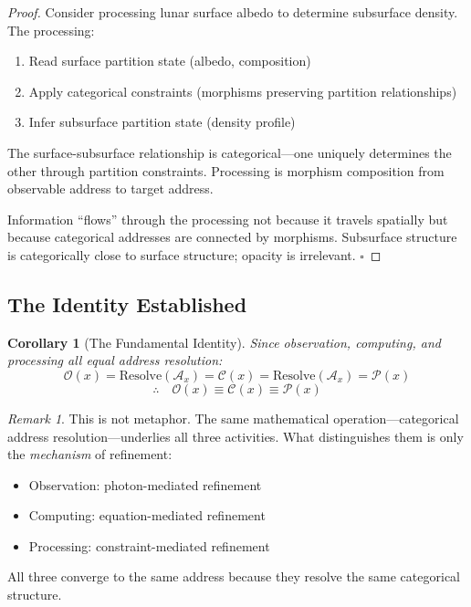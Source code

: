 \documentclass[12pt,a4paper]{article}
\newtheorem{corollary}[theorem]{Corollary}
\theoremstyle{definition}
\theoremstyle{remark}
\newtheorem{remark}[theorem]{Remark}
\newcommand{\Obs}{\mathcal{O}}
\newcommand{\Comp}{\mathcal{C}}
\newcommand{\Proc}{\mathcal{P}}
\begin{document}
\begin{proof}
Consider processing lunar surface albedo to determine subsurface density. The processing:
\begin{enumerate}
    \item Read surface partition state (albedo, composition)
    \item Apply categorical constraints (morphisms preserving partition relationships)
    \item Infer subsurface partition state (density profile)
\end{enumerate}

The surface-subsurface relationship is categorical---one uniquely determines the other through partition constraints. Processing is morphism composition from observable address to target address.

Information ``flows'' through the processing not because it travels spatially but because categorical addresses are connected by morphisms. Subsurface structure is categorically close to surface structure; opacity is irrelevant. $\square$
\end{proof}

\subsection{The Identity Established}

\begin{corollary}[The Fundamental Identity]
Since observation, computing, and processing all equal address resolution:
\begin{equation}
\Obs(x) = \text{Resolve}(\mathcal{A}_x) = \Comp(x) = \text{Resolve}(\mathcal{A}_x) = \Proc(x)
\end{equation}
\begin{equation}
\therefore \quad \boxed{\Obs(x) \equiv \Comp(x) \equiv \Proc(x)}
\end{equation}
\end{corollary}

\begin{remark}
This is not metaphor. The same mathematical operation---categorical address resolution---underlies all three activities. What distinguishes them is only the \emph{mechanism} of refinement:
\begin{itemize}
    \item Observation: photon-mediated refinement
    \item Computing: equation-mediated refinement
    \item Processing: constraint-mediated refinement
\end{itemize}
All three converge to the same address because they resolve the same categorical structure.
\end{remark}
\end{document}
